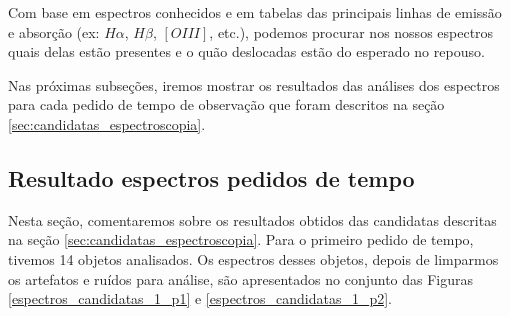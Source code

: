 Com base em espectros conhecidos e em tabelas das principais linhas de emissão e absorção (ex: $H\alpha$, $H\beta$, $[OIII]$, etc.), podemos procurar nos nossos espectros quais delas estão presentes e o quão deslocadas estão do esperado no repouso.

Nas próximas subseções, iremos mostrar os resultados das análises dos espectros para cada pedido de tempo de observação que foram descritos na seção \ref{sec:candidatas_espectroscopia}.

\subsection{Resultado espectros pedidos de tempo}

Nesta seção, comentaremos sobre os resultados obtidos das candidatas descritas na seção \ref{sec:candidatas_espectroscopia}. Para o primeiro pedido de tempo, tivemos 14 objetos analisados. Os espectros desses objetos, depois de limparmos os artefatos e ruídos para análise, são apresentados no conjunto das Figuras \ref{espectros_candidatas_1_p1} e \ref{espectros_candidatas_1_p2}.

